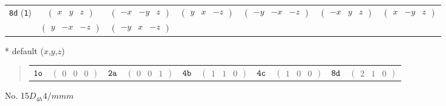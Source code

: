 \documentclass[fleqn,9pt,landscape]{jsarticle}
\begin{document}
\begin{center}
\begin{longtable}{ccccccc}
{\tt 8d} ({\tt 1}) & $ \begin{pmatrix} x & y & z \end{pmatrix} $ & $ \begin{pmatrix} - x & - y & z \end{pmatrix} $ & $ \begin{pmatrix} y & x & - z \end{pmatrix} $ & $ \begin{pmatrix} - y & - x & - z \end{pmatrix} $ & $ \begin{pmatrix} - x & y & z \end{pmatrix} $ & $ \begin{pmatrix} x & - y & z \end{pmatrix} $ \\
& $ \begin{pmatrix} y & - x & - z \end{pmatrix} $ & $ \begin{pmatrix} - y & x & - z \end{pmatrix} $ & $  $ & $  $ & $  $ & $  $ \\
\end{longtable}
\end{center}
* default ($x$,$y$,$z$)
\begin{quote}
\begin{tabular}{cccccccccc}
$ {\tt 1o} $ & $ \begin{pmatrix} 0 & 0 & 0 \end{pmatrix} $ & $ {\tt 2a} $ & $ \begin{pmatrix} 0 & 0 & 1 \end{pmatrix} $ & $ {\tt 4b} $ & $ \begin{pmatrix} 1 & 1 & 0 \end{pmatrix} $ & $ {\tt 4c} $ & $ \begin{pmatrix} 1 & 0 & 0 \end{pmatrix} $ & $ {\tt 8d} $ & $ \begin{pmatrix} 2 & 1 & 0 \end{pmatrix} $
\end{tabular}
\end{quote}
\newpage
No. 15\quad$D_{4h}$\quad$4/mmm$\quad[ tetragonal ]
\end{document}
